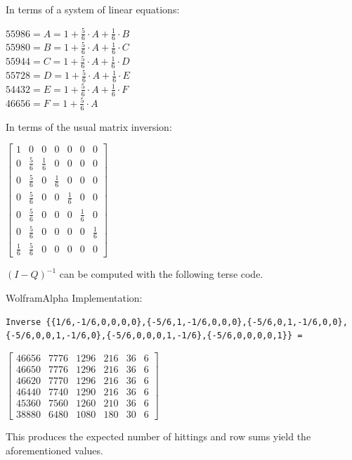 In terms of a system of linear equations:

$55986 = A = 1+\frac{5}{6} \cdot A+\frac{1}{6} \cdot B$ \\
$55980 = B = 1+\frac{5}{6} \cdot A+\frac{1}{6} \cdot C$ \\
$55944 = C = 1+\frac{5}{6} \cdot A+\frac{1}{6} \cdot D$ \\
$55728 = D = 1+\frac{5}{6} \cdot A+\frac{1}{6} \cdot E$ \\
$54432 = E = 1+\frac{5}{6} \cdot A+\frac{1}{6} \cdot F$ \\
$46656 = F = 1+\frac{5}{6} \cdot A$

In terms of the usual matrix inversion:

$
\begin{bmatrix}
1  &  0  &  0  &  0  &  0  &  0  & 0 \\
0 &  \frac{5}{6} & \frac{1}{6} &  0 &   0 &   0 &  0 \\
0 &  \frac{5}{6} &  0 &  \frac{1}{6} &  0 &   0 &  0 \\
0 &  \frac{5}{6} &  0 &   0 &  \frac{1}{6} &  0 &  0 \\
0 &  \frac{5}{6} &  0 &   0 &   0 &  \frac{1}{6} & 0 \\
0 &  \frac{5}{6} &  0 &   0 &   0 &   0 & \frac{1}{6} \\
\frac{1}{6} & \frac{5}{6} &  0 &   0 &   0 &   0 &  0
\end{bmatrix}
$

$(I-Q)^{-1}$ can be computed with the following terse code.

WolframAlpha Implementation:

\begin{verbatim}
Inverse {{1/6,-1/6,0,0,0,0},{-5/6,1,-1/6,0,0,0},{-5/6,0,1,-1/6,0,0},
{-5/6,0,0,1,-1/6,0},{-5/6,0,0,0,1,-1/6},{-5/6,0,0,0,0,1}} =
\end{verbatim}

$
\begin{bmatrix}
46656 & 7776 & 1296 & 216 & 36 & 6 \\
46650 & 7776 & 1296 & 216 & 36 & 6 \\
46620 & 7770 & 1296 & 216 & 36 & 6 \\
46440 & 7740 & 1290 & 216 & 36 & 6 \\
45360 & 7560 & 1260 & 210 & 36 & 6 \\
38880 & 6480 & 1080 & 180 & 30 & 6
\end{bmatrix}
$

This produces the expected number of hittings and row sums yield the aforementioned values.

